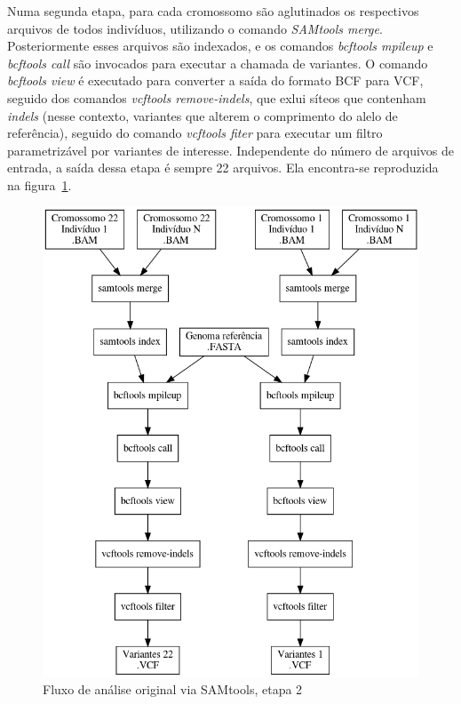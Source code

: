 \documentclass[cic,tc]{iiufrgs}
\begin{document}
Numa segunda etapa, para cada cromossomo são aglutinados os respectivos
arquivos de todos indivíduos, utilizando o comando \textit{SAMtools merge}.
Posteriormente esses arquivos são indexados, e os comandos \textit{bcftools
mpileup} e \textit{bcftools call} são invocados para executar a chamada de
variantes. O comando \textit{bcftools view} é executado para converter a saída
do formato BCF para VCF, seguido dos comandos \textit{vcftools remove-indels},
que exlui síteos que contenham \textit{indels} (nesse contexto, variantes que
alterem o comprimento do alelo de referência), seguido do comando
\textit{vcftools fiter} para executar um filtro parametrizável por variantes de
interesse. Independente do número de arquivos de entrada, a saída dessa etapa é
sempre 22 arquivos. Ela encontra-se reproduzida na
figura~\ref{fig:stage2_orig}.

\begin{figure}
  \caption{Fluxo de análise original via SAMtools, etapa 2}
    \begin{center}
      \includegraphics[width=0.85\linewidth]{img/stage2_orig.png}
    \end{center}
    \label{fig:stage2_orig}
\end{figure}
\end{document}
